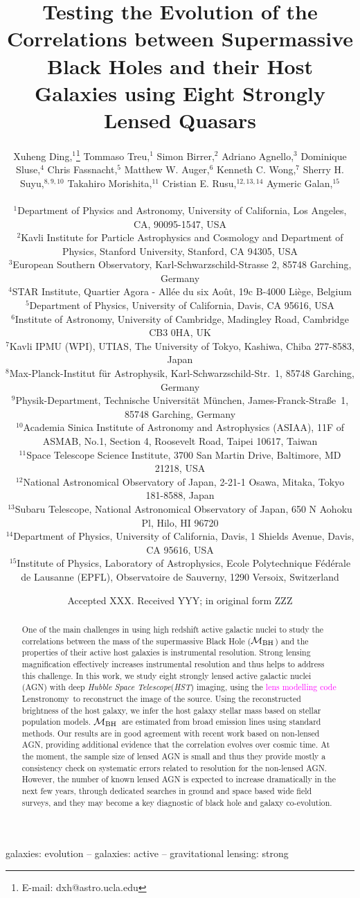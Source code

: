 \documentclass[fleqn,usenatbib]{mnras}
\title[Mass relations by lensed AGN hosts]{Testing the Evolution of the Correlations between Supermassive Black Holes and their Host Galaxies using Eight Strongly Lensed Quasars}
\author[X. Ding et al.]{
Xuheng Ding,$^{1}$\thanks{E-mail: dxh@astro.ucla.edu}
Tommaso Treu,$^{1}$
Simon Birrer,$^{2}$
Adriano Agnello,$^{3}$\newauthor
Dominique Sluse,$^{4}$
Chris Fassnacht,$^{5}$
Matthew W. Auger,$^{6}$
Kenneth C. Wong,$^{7}$ \newauthor
Sherry H. Suyu,$^{8,9,10}$
Takahiro Morishita,$^{11}$
Cristian E. Rusu,$^{12,13,14}$
Aymeric Galan,$^{15}$
\\
\\
$^{1}$Department of Physics and Astronomy, University of California, Los Angeles, CA, 90095-1547, USA\\
$^{2}$Kavli Institute for Particle Astrophysics and Cosmology and Department of Physics, Stanford University, Stanford, CA 94305, USA\\
$^{3}$European Southern Observatory, Karl-Schwarzschild-Strasse 2, 85748 Garching, Germany\\
$^{4}$STAR Institute, Quartier Agora - All\'ee du six Ao\^ut, 19c B-4000 Li\`ege, Belgium\\
$^{5}$Department of Physics, University of California, Davis, CA 95616, USA\\
$^{6}$Institute of Astronomy, University of Cambridge, Madingley Road, Cambridge CB3 0HA, UK\\
$^{7}$Kavli IPMU (WPI), UTIAS, The University of Tokyo, Kashiwa, Chiba 277-8583, Japan\\
$^{8}$Max-Planck-Institut f{\"u}r Astrophysik, Karl-Schwarzschild-Str.~1, 85748 Garching, Germany\\
$^{9}$Physik-Department, Technische Universit\"at M\"unchen, James-Franck-Stra\ss{}e~1, 85748 Garching, Germany\\
$^{10}$Academia Sinica Institute of Astronomy and Astrophysics (ASIAA), 11F of ASMAB, No.1, Section 4, Roosevelt Road, Taipei 10617, Taiwan\\
$^{11}$Space Telescope Science Institute, 3700 San Martin Drive, Baltimore, MD 21218, USA\\
$^{12}$National Astronomical Observatory of Japan, 2-21-1 Osawa, Mitaka, Tokyo 181-8588, Japan\\
$^{13}$Subaru Telescope, National Astronomical Observatory of Japan, 650 N Aohoku Pl, Hilo, HI 96720\\
$^{14}$Department of Physics, University of California, Davis, 1 Shields Avenue, Davis, CA 95616, USA\\
$^{15}$Institute of Physics, Laboratory of Astrophysics, Ecole Polytechnique 
F\'ed\'erale de Lausanne (EPFL), Observatoire de Sauverny, 1290 Versoix, 
Switzerland
}
\date{Accepted XXX. Received YYY; in original form ZZZ}
\newcommand{\hst}{{\it HST}}
\newcommand{\mbh}{$\mathcal M_{\rm BH}$}
\newcommand{\lenstronomy}{{\sc Lenstronomy}}
\newcommand{\pink}[1]{{\textcolor{magenta}{#1}}}
\begin{document}
\label{firstpage}
\pagerange{\pageref{firstpage}--\pageref{lastpage}}
\maketitle

\begin{abstract}
  One of the main challenges in using high redshift active galactic nuclei to study the correlations between the mass of the supermassive Black Hole (\mbh) and the properties of their active host galaxies is instrumental resolution. Strong lensing magnification effectively increases instrumental resolution and thus helps to address this challenge. In this work, we study eight strongly lensed active galactic nuclei (AGN) with deep {\it Hubble Space Telescope}(\hst) imaging, using the \pink{lens modelling code} \lenstronomy\ to reconstruct the image of the source. Using the reconstructed brightness of the host galaxy, we infer the host galaxy stellar mass based on stellar population models. 
  \mbh\ are estimated from broad emission lines using standard methods. Our results are in good agreement with recent work based on non-lensed AGN, providing additional evidence that the correlation evolves over cosmic time.  At the moment, the sample size of lensed AGN is small and thus they provide mostly a consistency check on systematic errors related to resolution for the non-lensed AGN. However, the number of known lensed AGN is expected to increase dramatically in the next few years, through dedicated searches in ground and space based wide field surveys, and they may become a key diagnostic of black hole and galaxy co-evolution. 
\end{abstract}

\begin{keywords}
galaxies: evolution -- galaxies: active -- gravitational lensing: strong
\end{keywords}


\end{document}
